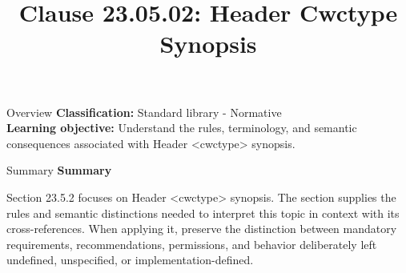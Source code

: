 \documentclass[10pt,letterpaper]{article}
\title{Clause 23.05.02: Header Cwctype Synopsis}
\author{}
\date{}
\begin{document}
\maketitle
\begin{CornellOverviewBox}{Overview}
\textbf{Classification:} Standard library - Normative\\[2pt]
\textbf{Learning objective:} Understand the rules, terminology, and semantic consequences associated with Header <cwctype> synopsis.
\end{CornellOverviewBox}\begin{CornellSummaryBox}{Summary}
{\sffamily\bfseries\color{Accent} Summary}\par\vspace{3pt}Section 23.5.2 focuses on Header <cwctype> synopsis. The section supplies the rules and semantic distinctions needed to interpret this topic in context with its cross-references. When applying it, preserve the distinction between mandatory requirements, recommendations, permissions, and behavior deliberately left undefined, unspecified, or implementation-defined.
\end{CornellSummaryBox}
\end{document}
